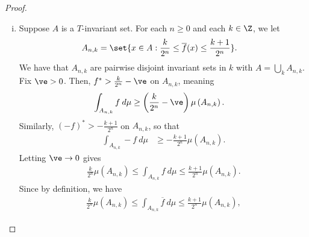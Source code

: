\documentclass[10pt]{mypackage}
\begin{document}
\begin{proof}
\begin{enumerate}[(i)]
\begin{align*}
      \end{align*}
      so that $\left\vert \overline{f} \right\vert \leq \overline{\left\vert f \right\vert}$, whence
      \begin{align*}
        \int_{}^{} \left\vert \overline{f} \right\vert\:d\mu &\leq \int_{}^{} \overline{\left\vert f \right\vert}\:d\mu\\
                                                             &\leq \liminf_{n\rightarrow\infty} \int_{}^{} \frac{1}{n}\sum_{k=0}^{n-1}\left\vert f\circ T^{k}\right\vert\:d\mu\\
                                                             &= \int_{}^{} \left\vert f \right\vert\:d\mu\\
                                                             &< \infty,
      \end{align*}
      where we use the fact that $T$ is measure-preserving in the second-to-last line.
    \item Suppose $A$ is a $T$-invariant set. For each $n\geq 0$ and each $k\in \Z$, we let
      \begin{align*}
        A_{n,k} &= \set{x\in A : \frac{k}{2^{n}} \leq \overline{f}(x) \leq \frac{k+1}{2^{n}}}.
      \end{align*}
      We have that $A_{n,k}$ are pairwise disjoint invariant sets in $k$ with $A = \bigcup_{k}A_{n,k}$. Fix $\ve > 0$. Then, $ f^{\ast} > \frac{k}{2^{n}} - \ve $ on $A_{n,k}$, meaning
      \begin{align*}
        \int_{A_{n,k}}^{} f\:d\mu &\geq \left( \frac{k}{2^{n}} - \ve \right)\mu\left( A_{n,k} \right).
      \end{align*}
      Similarly, $ \left( -f \right)^{\ast} > -\frac{k+1}{2^{n}} $ on $A_{n,k}$, so that
      \begin{align*}
        \int_{A_{n,k}}^{} -f\:d\mu &\geq -\frac{k+1}{2^{n}} \mu\left( A_{n,k} \right).
      \end{align*}
      Letting $\ve\rightarrow 0$ gives 
      \begin{align*}
        \frac{k}{2^{n}} \mu\left( A_{n,k} \right) \leq \int_{A_{n,k}}^{} f\:d\mu \leq \frac{k+1}{2^{n}}\mu\left( A_{n,k} \right).
      \end{align*}
      Since by definition, we have
      \begin{align*}
        \frac{k}{2^{n}}\mu\left( A_{n,k} \right) \leq \int_{A_{n,k}}^{} \overline{f}\:d\mu \leq \frac{k+1}{2^{n}} \mu\left( A_{n,k} \right),
      \end{align*}

\end{enumerate}
\end{proof}
\end{document}
